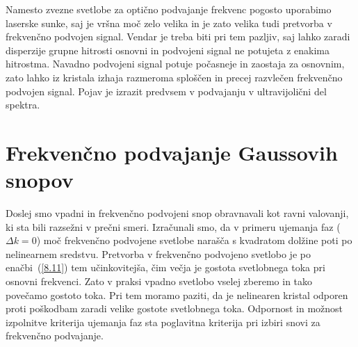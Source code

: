 \begin{remark}
Namesto zvezne svetlobe za optično podvajanje frekvenc pogosto uporabimo laserske sunke, saj je 
vršna moč zelo velika in je zato velika tudi pretvorba v frekvenčno podvojen signal.
Vendar je treba biti pri tem pazljiv, saj lahko zaradi disperzije grupne hitrosti osnovni in 
podvojeni signal ne potujeta z enakima hitrostma. Navadno podvojeni signal potuje 
počasneje in zaostaja za osnovnim, zato lahko iz kristala izhaja razmeroma sploščen in 
precej razvlečen frekvenčno podvojen signal. Pojav je izrazit predvsem v podvajanju v
ultravijolični del spektra.
\end{remark}

\section{Frekvenčno podvajanje Gaussovih snopov}
Doslej smo vpadni in frekvenčno podvojeni snop obravnavali kot ravni valovanji,
ki sta bili razsežni v prečni smeri. Izračunali smo, da v primeru 
ujemanja faz ($\Delta k=0$)
moč frekvenčno podvojene svetlobe narašča s kvadratom dolžine poti po nelinearnem
sredstvu. Pretvorba v frekvenčno podvojeno svetlobo je po enačbi~(\ref{8.11}) tem
učinkovitejša, čim večja je gostota svetlobnega toka pri osnovni frekvenci.
Zato v praksi vpadno svetlobo vselej zberemo in tako povečamo gostoto toka. 
Pri tem moramo paziti, da je nelinearen kristal odporen proti poškodbam
zaradi velike gostote svetlobnega toka. Odpornost in možnost izpolnitve kriterija ujemanja 
faz sta poglavitna kriterija pri izbiri snovi za frekvenčno podvajanje. 

